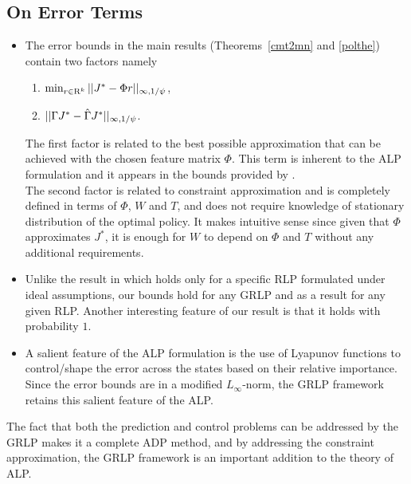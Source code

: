 \documentclass[12pt,draftcls,onecolumn]{IEEEtran}
\begin{document}
\subsection{On Error Terms}
\begin{itemize}
\item The error bounds in the main results (Theorems~\ref{cmt2mn} and \ref{polthe}) contain two factors namely
\begin{enumerate}
\item $\min_{r\in \mathrm{R}^k} ||J^*-\Phi r||_{\infty,1/\psi}$,
\item $||\Gamma J^*-\hat{\Gamma} J^*||_{\infty,1/\psi}$.
\end{enumerate}
The first factor is related to the best possible approximation that can be achieved with the chosen feature matrix $\Phi$. This term is inherent to the ALP formulation and it appears in the bounds provided by \cite{ALP}.\\
The second factor is related to constraint approximation and is completely defined in terms of $\Phi$, $W$ and $T$, and does not require knowledge of stationary distribution of the optimal policy. It makes intuitive sense since given that $\Phi$ approximates $J^*$, it is enough for $W$ to depend on $\Phi$ and $T$ without any additional requirements.
\item Unlike the result in \cite{CS} which holds only for a specific RLP formulated under ideal assumptions, our bounds hold for any GRLP and as a result for any given RLP. Another interesting feature of our result is that it holds with probability $1$. 
\item A salient feature of the ALP formulation is the use of Lyapunov functions to control/shape the error across the states based on their relative importance. Since the error bounds are in a modified $L_\infty$-norm, the GRLP framework retains this salient feature of the ALP.
\end{itemize}
The fact that both the prediction and control problems can be addressed by the GRLP makes it a complete ADP method, and by addressing the constraint approximation, the GRLP framework is an important addition to the theory of ALP.
\end{document}
